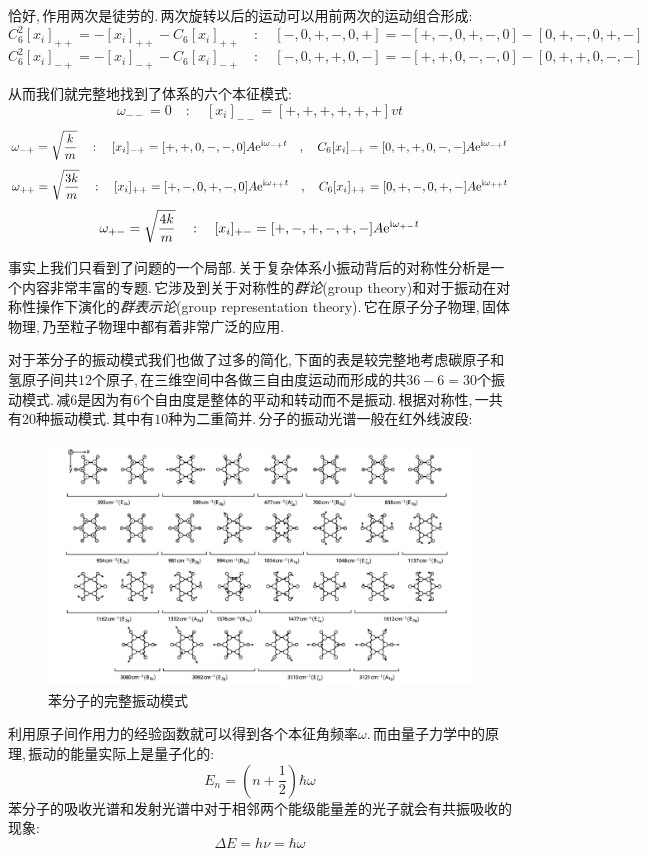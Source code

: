 恰好,\,作用两次是徒劳的.\,两次旋转以后的运动可以用前两次的运动组合形成:
\[C_6^2[x_i]_{++}=-[x_i]_{++}-C_6[x_i]_{++}\quad:\quad [-,0,+,-,0,+]=-[+,-,0,+,-,0]-[0,+,-,0,+,-]\]
\[C_6^2[x_i]_{-+}=-[x_i]_{-+}-C_6[x_i]_{-+}\quad:\quad [-,0,+,+,0,-]=-[+,+,0,-,-,0]-[0,+,+,0,-,-]\]

从而我们就完整地找到了体系的六个本征模式:
\[\omega_{--}=0\quad:\quad [x_i]_{--}=[+,+,+,+,+,+]vt\]
\[\omega_{-+}=\sqrt{\frac{k}{m}}\quad:\quad [x_i]_{-+}=[+,+,0,-,-,0]A{\rm e}^{{\rm i}\omega_{-+} t}\quad,\quad C_6[x_i]_{-+}=[0,+,+,0,-,-]A{\rm e}^{{\rm i}\omega_{-+} t}\]
\[\omega_{++}=\sqrt{\frac{3k}{m}}\quad:\quad [x_i]_{++}=[+,-,0,+,-,0]A{\rm e}^{{\rm i}\omega_{++} t}\quad,\quad C_6[x_i]_{++}=[0,+,-,0,+,-]A{\rm e}^{{\rm i}\omega_{++} t}\]
\[\omega_{+-}=\sqrt{\frac{4k}{m}}\quad:\quad [x_i]_{+-}=[+,-,+,-,+,-]A{\rm e}^{{\rm i}\omega_{+-} t}\]

事实上我们只看到了问题的一个局部.\,关于复杂体系小振动背后的对称性分析是一个内容非常丰富的专题.\,它涉及到关于对称性的\emph{群论}(group theory)和对于振动在对称性操作下演化的\emph{群表示论}(group representation theory).\,它在原子分子物理,\,固体物理,\,乃至粒子物理中都有着非常广泛的应用.

对于苯分子的振动模式我们也做了过多的简化,\,下面的表是较完整地考虑碳原子和氢原子间共$12$个原子,\,在三维空间中各做三自由度运动而形成的共$36-6=30$个振动模式.\,减$6$是因为有$6$个自由度是整体的平动和转动而不是振动.\,根据对称性,\,一共有$20$种振动模式.\,其中有$10$种为二重简并.\,分子的振动光谱一般在红外线波段:
\begin{figure}[H]
\centering
\includegraphics[width=17cm]{image/6-3-9.png}
\caption{苯分子的完整振动模式}
\end{figure}

利用原子间作用力的经验函数就可以得到各个本征角频率$\omega$.\,而由量子力学中的原理,\,振动的能量实际上是量子化的:
\[E_n=\left(n+\frac{1}{2}\right)\hbar\omega\]
苯分子的吸收光谱和发射光谱中对于相邻两个能级能量差的光子就会有共振吸收的现象:
\[\Delta E=h\nu =\hbar \omega\]

